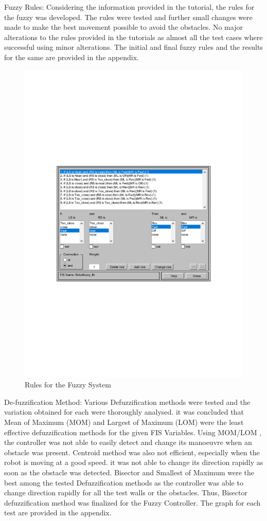 \documentclass{l4proj}
\begin{document}
Fuzzy Rules: Considering the information provided in the tutorial, the rules for the fuzzy was developed. The rules were tested and further small changes were made to make the best movement possible to avoid the obstacles. No major alterations to the rules provided in the tutorials as almost all the test cases where successful using minor alterations. The initial and final fuzzy rules and the results for the same are provided in the appendix.
\newpage
\begin{figure}[htb]
    \centering
    \includegraphics[width=0.5\linewidth]{images/rules.pdf}

    \caption{Rules for the Fuzzy System
    }

    \label{fig:Rootlocus} 
\end{figure}

De-fuzzification Method: Various Defuzzification methods were tested and the variation obtained for each were thoroughly analysed. it was concluded that Mean of Maximum (MOM) and Largest of Maximum (LOM) were the least effective defuzzification methods for the given FIS Variables. Using MOM/LOM , the controller was not able to easily detect and change its manoeuvre when an obstacle was present. Centroid method was also not efficient, especially when the robot is moving at a good speed. it was not able to change its direction rapidly as soon as the obstacle was detected. Bisector and Smallest of Maximum were the best among the tested Defuzzification methods as the controller was able to change direction rapidly for all the test walls or the obstacles. Thus, Bisector defuzzification method was finalized for the Fuzzy Controller. The graph for each test are provided in the appendix.
\end{document}
